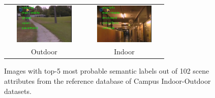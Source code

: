 \documentclass[letterpaper, 10 pt, conference]{ieeeconf}  %
\begin{document}
\newcommand{\widthA}{3.8cm}
\newcommand{\heightA}{1.9cm}
\begin{figure}
	\centering
	\begin{tabular}{cc}
		\includegraphics[width=\widthA,height=\heightA]{1-outdoor}&
		\includegraphics[width=\widthA,height=\heightA]{3-indoor} \\
		Outdoor & Indoor \\
	\end{tabular}
	\caption{Images with top-5 most probable semantic labels out of 102 scene attributes from the reference database of Campus Indoor-Outdoor datasets.}
	\label{fig:labelledImages}
\end{figure}
\end{document}
